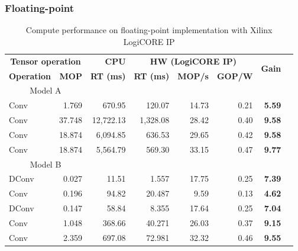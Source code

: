 \subsubsection{Floating-point}
\begin{table}[!htp]\centering
	\caption{Compute performance on floating-point implementation with Xilinx LogiCORE IP}\label{tab:performace_float_logicore }
	\scriptsize
	\begin{tabular}{lrrrrrrr}\toprule
		\multicolumn{2}{c}{\textbf{Tensor operation}} &\textbf{CPU} &\multicolumn{3}{c}{\textbf{HW (LogiCORE IP)}} &\multirow{2}{*}{\textbf{Gain}} \\\cmidrule{1-6}
		\textbf{Operation} &\textbf{MOP} &\textbf{RT (ms)} &\textbf{RT (ms)} &\textbf{MOP/s} &\textbf{GOP/W} & \\\midrule
		\multicolumn{2}{c}{Model A} & & & & & \\
		Conv &1.769 &670.95 &120.07 &14.73 &0.21 &\textbf{5.59} \\
		Conv &37.748 &12,722.13 &1,328.08 &28.42 &0.40 &\textbf{9.58} \\
		Conv &18.874 &6,094.85 &636.53 &29.65 &0.42 &\textbf{9.58} \\
		Conv &18.874 &5,564.79 &569.30 &33.15 &0.47 &\textbf{9.77} \\
		\multicolumn{2}{c}{Model B} & & & & & \\
		DConv &0.027 &11.51 &1.557 &17.75 &0.25 &\textbf{7.39} \\
		Conv &0.196 &94.82 &20.487 &9.59 &0.13 &\textbf{4.62} \\
		DConv &0.147 &58.84 &8.355 &17.64 &0.25 &\textbf{7.04} \\
		Conv &1.048 &368.66 &40.271 &26.03 &0.37 &\textbf{9.15} \\
		Conv &2.359 &697.08 &72.981 &32.32 &0.46 &\textbf{9.55} \\
		\bottomrule
	\end{tabular}
\end{table}

